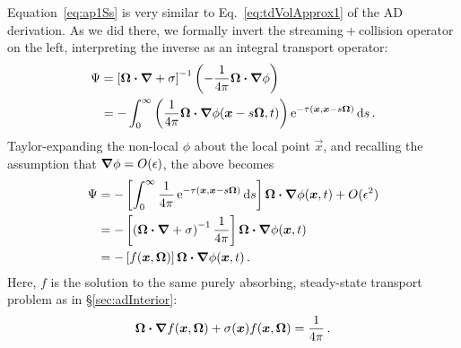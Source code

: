 Equation~\eqref{eq:ap1Ss} is very similar to Eq.~\eqref{eq:tdVolApprox1} of the
AD derivation. As we did there, we formally invert the streaming${}+{}$collision
operator on the left, interpreting the inverse as an integral transport
operator:
\begin{align*}
  \Psi
  &= \left[ \bm{\Omega}\bm{\cdot} \bm{\nabla} + \sigma \right]^{-1} \left(
  - \frac{1}{4\pi} \bm{\Omega}\bm{\cdot} \bm{\nabla} \phi \right)
  \\
  &= - \int_{0}^{\infty}
  \left( \frac{1}{4\pi} \bm{\Omega}\bm{\cdot} \bm{\nabla} \phi(\bm{x} - s \bm{\Omega},
  t)\right)
  \mathop{}\!\mathrm{e}^{ -\tau(\bm{x}, \bm{x} - s \bm{\Omega})}
  \mathop{}\!\mathrm{d} s \,.
\end{align*}
Taylor-expanding the non-local $\phi$ about the local point $\vec{x}$, and
recalling the assumption that $\bm{\nabla}\phi = O(\epsilon)$, the above becomes
\begin{align} \nonumber
\Psi
&= - \left[ \int_{0}^{\infty} \frac{1}{4\pi} 
    \mathop{}\!\mathrm{e}^{ -\tau(\bm{x}, \bm{x} - s \bm{\Omega})}
      \mathop{}\!\mathrm{d} s \right] \bm{\Omega}\bm{\cdot} \bm{\nabla}\phi(\bm{x}, t) + O(\epsilon^2)
\\ \nonumber
&= - 
  \left[\left(\bm{\Omega}\bm{\cdot} \bm{\nabla}  + \sigma \right)^{-1}
  \frac{1}{4\pi}\right] \bm{\Omega}\bm{\cdot} \bm{\nabla} \phi(\bm{x}, t)
\\ \label{eq:ap1capPsiApprox}
&= - \left[ f(\bm{x},\bm{\Omega}) \right] \bm{\Omega}\bm{\cdot} \bm{\nabla} \phi(\bm{x}, t)\,.
\end{align}
Here, $f$ is the solution to the same purely absorbing, steady-state transport
problem as in \S\ref{sec:adInterior}:
\begin{equation} \tagref{eq:fFullVol}
  \vec{\Omega}\vd \grad f(\vec{x}, \vec{\Omega})
  + \sigma(\vec{x}) f (\vec{x}, \vec{\Omega})
= \frac{1}{4\pi} \,.
\end{equation}

